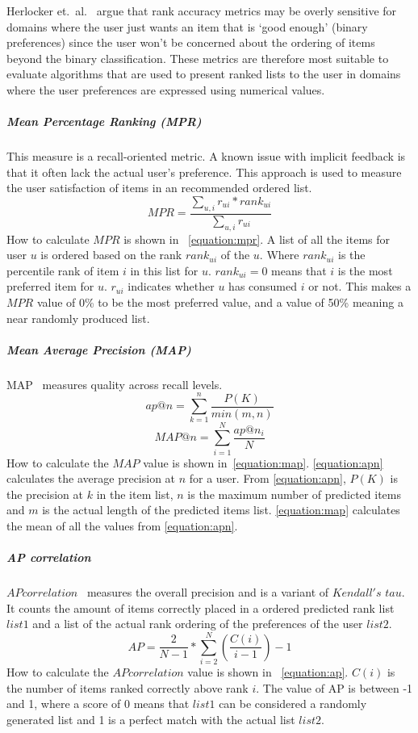Herlocker et.\ al.~\cite{Herlocker2004} argue that rank accuracy metrics may be
overly sensitive for domains where the user just wants an item that is `good
enough' (binary preferences) since the user won't be concerned about the
ordering of items beyond the binary classification. These metrics are therefore
most suitable to evaluate algorithms that are used to present ranked lists to
the user in domains where the user preferences are expressed using numerical
values.

\subparagraph{Mean Percentage Ranking (MPR)}
\label{subp:mean_percentage_ranking_}
This measure is a recall-oriented metric.
A known issue with implicit feedback is that it often lack the actual user's preference.
This approach is used to measure the user satisfaction of items in an recommended ordered list.
\begin{equation}
	MPR = \frac{\sum_{u,i}{r_{ui} * rank_{ui}}}{\sum_{u,i}{r_{ui}}}
	\label{equation:mpr}
\end{equation}
How to calculate $MPR$ is shown in ~\ref{equation:mpr}.
A list of all the items for user $u$ is ordered based on the rank $rank_{ui}$ of the $u$.
Where $rank_{ui}$ is the percentile rank of item $i$ in this list for $u$.
$rank_{ui} = 0$ means that $i$ is the most preferred item for $u$.
$r_{ui}$ indicates whether $u$ has consumed $i$ or not.
This makes a $MPR$ value of 0\% to be the most preferred value, and a value of 50\% meaning a near randomly produced list.

\subparagraph{Mean Average Precision (MAP)}
\label{subp:mean_average_precision_map_}
MAP~\cite{Manning:2008:IIR:1394399} measures quality across recall levels.
\begin{equation}
	ap@n = \sum_{k=1}^{n}{\frac{P(K)}{min(m,n)}}
	\label{equation:apn}
\end{equation}
\begin{equation}
	MAP@n = \sum_{i=1}^{N}{\frac{ap@n_i}{N}}
	\label{equation:map}
\end{equation}
How to calculate the $MAP$ value is shown in~\ref{equation:map}.
\ref{equation:apn} calculates the average precision at $n$ for a user.
From \ref{equation:apn}, $P(K)$ is the precision at $k$ in the item list, $n$ is the maximum number of predicted items and $m$ is the actual length of the predicted items list.
\ref{equation:map} calculates the mean of all the values from \ref{equation:apn}.


\subparagraph{AP correlation}
\label{subp:ap_correlation}
$AP correlation$~\cite{Yilmaz:2008:NRC:1390334.1390435} measures the overall precision and is a variant of $Kendall's$ $tau$.
It counts the amount of items correctly placed in a ordered predicted rank list $list1$ and a list of the actual rank ordering of the preferences of the user $list2$.
\begin{equation}
	AP = \frac{2}{N - 1} * \sum_{i=2}^{N}{(\frac{C(i)}{i - 1})} - 1
	\label{equation:ap}
\end{equation}
How to calculate the $AP correlation$ value is shown in ~\ref{equation:ap}.
$C(i)$ is the number of items ranked correctly above rank $i$.
The value of AP is between -1 and 1, where a score of 0 means that $list1$ can be considered a randomly generated list and 1 is a perfect match with the actual list $list2$.

